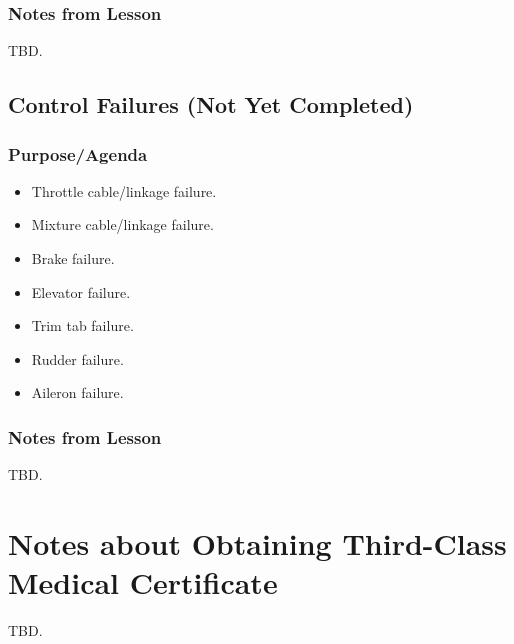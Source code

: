\documentclass[letterpaper,10pt,titlepage]{article}
\begin{document}
\subsubsection{Notes from Lesson}
\label{sfle0:sefa0:snff0}

TBD.


\subsection{Control Failures (Not Yet Completed)}
\label{sfle0:scfa0}



\subsubsection{Purpose/Agenda}
\label{sfle0:scfa0:spov0}

\begin{itemize}
\item Throttle cable/linkage failure.
\item Mixture cable/linkage failure.
\item Brake failure.
\item Elevator failure.
\item Trim tab failure.
\item Rudder failure.
\item Aileron failure.
\end{itemize}


\subsubsection{Notes from Lesson}
\label{sfle0:scfa0:snff0}

TBD.


\section{Notes about Obtaining Third-Class Medical Certificate}
\label{stcm0}

TBD.

\end{document}
